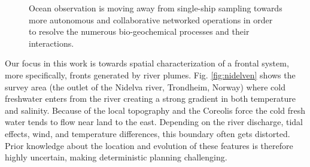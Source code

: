\documentclass[aoas]{imsart}
\begin{document}
\begin{figure}[!h] 
  \centering 
  \hfill
  \caption{Ocean observation is moving away from single-ship sampling
    towards more autonomous and collaborative networked operations in
    order to resolve the numerous bio-geochemical processes and their
    interactions.}
\label{fig:envir}
\end{figure}

Our focus in this work is towards spatial characterization of a
frontal system, more specifically, fronts generated by river
plumes. Fig. \ref{fig:nidelven} shows the survey area (the outlet of
the Nidelva river, Trondheim, Norway) where cold freshwater enters
from the river creating a strong gradient in both temperature and
salinity. Because of the local topography and the Coreolis force
\citep{coriolis1835memoire} the cold fresh water tends to flow near
land to the east. Depending on the river discharge, tidal effects,
wind, and temperature differences, this boundary often gets
distorted. Prior knowledge about the location and evolution of these
features is therefore highly uncertain, making deterministic planning
challenging.
\end{document}
